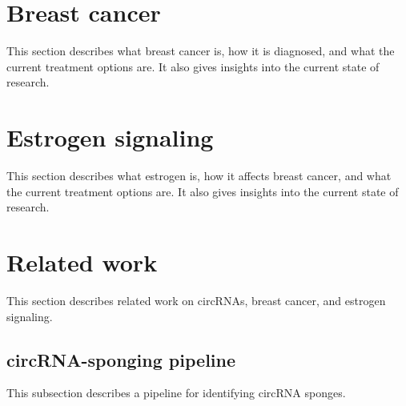 \lipsum[2]

\section{Breast cancer}
This section describes what breast cancer is, how it is diagnosed, and what the
current treatment options are. It also gives insights into the current state of
research.

\lipsum[3]

\section{Estrogen signaling}
This section describes what estrogen is, how it affects breast cancer, and what
the current treatment options are. It also gives insights into the current state
of research.

\lipsum[4]

\section{Related work}
This section describes related work on circRNAs, breast cancer, and estrogen
signaling.

\subsection{circRNA-sponging pipeline}
This subsection describes a pipeline for identifying circRNA sponges.